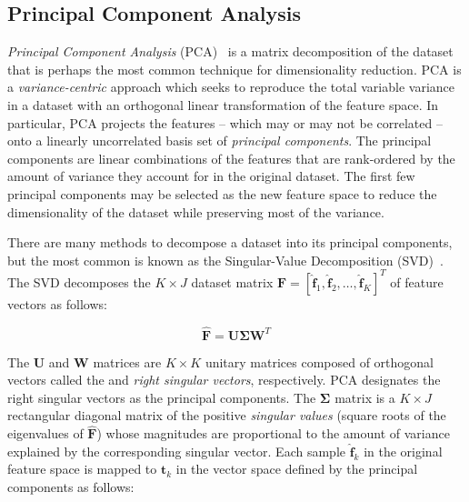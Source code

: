 \subsection{Principal Component Analysis}
\label{subsec:chap10-pca}

\textit{Principal Component Analysis} (PCA)~\cite{jolliffe2002pca} is a matrix decomposition of the dataset that is perhaps the most common technique for dimensionality reduction. PCA is a \textit{variance-centric} approach which seeks to reproduce the total variable variance in a dataset with an orthogonal linear transformation of the feature space. In particular, PCA projects the features -- which may or may not be correlated -- onto a linearly uncorrelated basis set of \textit{principal components}. The principal components are linear combinations of the features that are rank-ordered by the amount of variance they account for in the original dataset. The first few principal components may be selected as the new feature space to reduce the dimensionality of the dataset while preserving most of the variance.

There are many methods to decompose a dataset into its principal components, but the most common is known as the Singular-Value Decomposition (SVD)~\cite{golub1970svd}. The SVD decomposes the $K \times J$ dataset matrix $\boldsymbol{F} = \left[\boldsymbol{\hat{f}}_{1}, \boldsymbol{\hat{f}}_{2}, \dots, \boldsymbol{\hat{f}}_{K}\right]^{T} $ of feature vectors as follows:


\begin{equation}
\label{eqn:chap10-svd}
\boldsymbol{\hat{F}} = \boldsymbol{U}\boldsymbol{\Sigma}\boldsymbol{W}^{T}
\end{equation}

\noindent The $\boldsymbol{U}$ and $\boldsymbol{W}$ matrices are $K \times K$ unitary matrices composed of orthogonal vectors called the  and \textit{right singular vectors}, respectively. PCA designates the right singular vectors as the principal components. The $\boldsymbol{\Sigma}$ matrix is a $K \times J$ rectangular diagonal matrix of the positive \textit{singular values} (square roots of the eigenvalues of $\boldsymbol{\hat{F}}$) whose magnitudes are proportional to the amount of variance explained by the corresponding singular vector. Each sample $\boldsymbol{\hat{f}}_{k}$ in the original feature space is mapped to $\boldsymbol{t}_{k}$ in the vector space defined by the principal components as follows:

